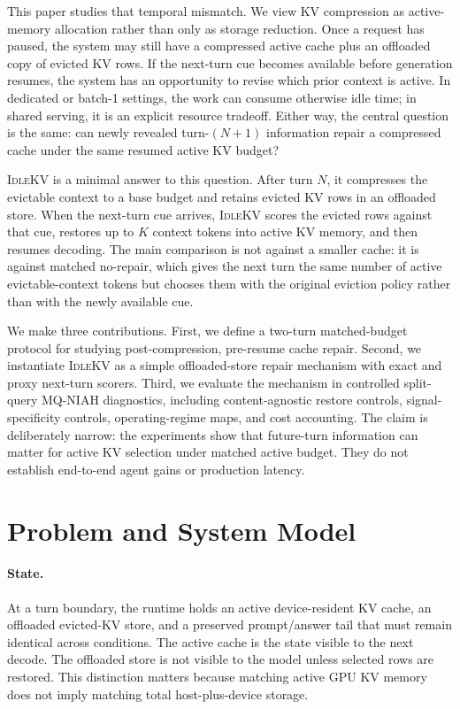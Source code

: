 \documentclass{article}
\newcommand{\idlekv}{\textsc{IdleKV}}
\begin{document}
This paper studies that temporal mismatch.
We view KV compression as active-memory allocation rather than only as
storage reduction.
Once a request has paused, the system may still have a compressed active
cache plus an offloaded copy of evicted KV rows.
If the next-turn cue becomes available before generation resumes, the
system has an opportunity to revise which prior context is active.
In dedicated or batch-1 settings, the work can consume otherwise idle
time; in shared serving, it is an explicit resource tradeoff.
Either way, the central question is the same: can newly revealed
turn-$(N+1)$ information repair a compressed cache under the same
resumed active KV budget?

\idlekv{} is a minimal answer to this question.
After turn $N$, it compresses the evictable context to a base budget and
retains evicted KV rows in an offloaded store.
When the next-turn cue arrives, \idlekv{} scores the evicted rows against
that cue, restores up to $K$ context tokens into active KV memory, and
then resumes decoding.
The main comparison is not against a smaller cache: it is against
matched no-repair, which gives the next turn the same number of active
evictable-context tokens but chooses them with the original eviction
policy rather than with the newly available cue.

We make three contributions.
First, we define a two-turn matched-budget protocol for studying
post-compression, pre-resume cache repair.
Second, we instantiate \idlekv{} as a simple offloaded-store repair
mechanism with exact and proxy next-turn scorers.
Third, we evaluate the mechanism in controlled split-query MQ-NIAH
diagnostics, including content-agnostic restore controls,
signal-specificity controls, operating-regime maps, and cost accounting.
The claim is deliberately narrow: the experiments show that future-turn
information can matter for active KV selection under matched active
budget.
They do not establish end-to-end agent gains or production latency.
 
\section{Problem and System Model}
\label{sec:problem}

\paragraph{State.}
At a turn boundary, the runtime holds an active device-resident KV cache,
an offloaded evicted-KV store, and a preserved prompt/answer tail that
must remain identical across conditions.
The active cache is the state visible to the next decode.
The offloaded store is not visible to the model unless selected rows are
restored.
This distinction matters because matching active GPU KV memory does not
imply matching total host-plus-device storage. 
\end{document}

